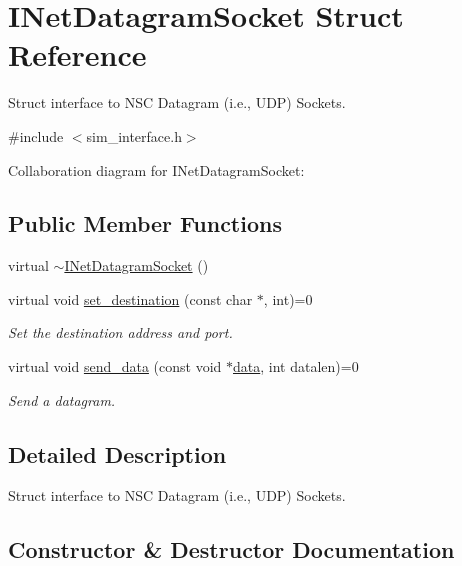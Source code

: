 \hypertarget{structINetDatagramSocket}{}\section{I\+Net\+Datagram\+Socket Struct Reference}
\label{structINetDatagramSocket}


Struct interface to N\+SC Datagram (i.\+e., U\+DP) Sockets.  




{\ttfamily \#include $<$sim\+\_\+interface.\+h$>$}



Collaboration diagram for I\+Net\+Datagram\+Socket\+:
\subsection*{Public Member Functions}
\begin{DoxyCompactItemize}
\item 
virtual \hyperlink{structINetDatagramSocket_a504a61a31c282b2c0b0e37f90c9a12da}{$\sim$\+I\+Net\+Datagram\+Socket} ()
\item 
virtual void \hyperlink{structINetDatagramSocket_a710adcfd98e3ba5dce61e56202889f0f}{set\+\_\+destination} (const char $\ast$, int)=0
\begin{DoxyCompactList}\small\item\em Set the destination address and port. \end{DoxyCompactList}\item 
virtual void \hyperlink{structINetDatagramSocket_acc2aa0893f69fceba101eaafaf784f02}{send\+\_\+data} (const void $\ast$\hyperlink{topology-example-sim_8cc_a26c65296e316af77b787dc77469bb2a4}{data}, int datalen)=0
\begin{DoxyCompactList}\small\item\em Send a datagram. \end{DoxyCompactList}\end{DoxyCompactItemize}


\subsection{Detailed Description}
Struct interface to N\+SC Datagram (i.\+e., U\+DP) Sockets. 

\subsection{Constructor \& Destructor Documentation}
